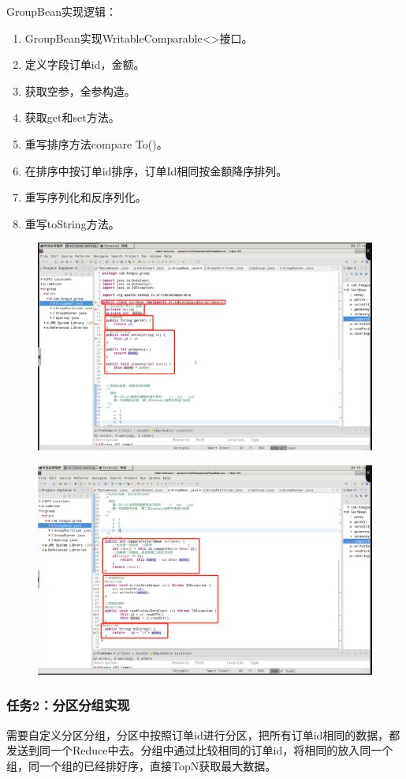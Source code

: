 \documentclass {article}
\begin{document}
				GroupBean实现逻辑：
				\begin{enumerate}
					\item GroupBean实现WritableComparable<>接口。
					\item 定义字段订单id，金额。
					\item 获取空参，全参构造。
					\item 获取get和set方法。
					\item 重写排序方法compare To()。
					\item 在排序中按订单id排序，订单Id相同按金额降序排列。
					\item 重写序列化和反序列化。
					\item 重写toString方法。	
				\end{enumerate}
				\begin{figure}[H]
					\centering
					\includegraphics[width=4.5in]{figures/fig20.jpg}
				\end{figure}
				\begin{figure}[H]
					\centering
					\includegraphics[width=4.5in]{figures/fig21.jpg}
				\end{figure}
				
			\subsubsection{任务2：分区分组实现}
				需要自定义分区分组，分区中按照订单id进行分区，把所有订单id相同的数据，都发送到同一个Reduce中去。分组中通过比较相同的订单id，将相同的放入同一个组，同一个组的已经排好序，直接TopN获取最大数据。
				
\end{document}

